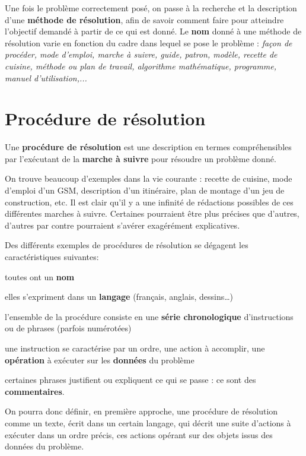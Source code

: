 		Une fois le problème correctement posé, on passe à la recherche et la
		description d’une \textbf{méthode de résolution}, afin de savoir
		comment faire pour atteindre l’objectif demandé à partir de ce qui est
		donné. Le \textbf{nom} donné à une méthode de résolution varie en
		fonction du cadre dans lequel se pose le problème : \textit{façon de
		procéder, mode d’emploi, marche à suivre, guide, patron, modèle,
		recette de cuisine, méthode ou plan de travail, algorithme
		mathématique, programme, manuel d’utilisation,...}

\section{Procédure de résolution}

	Une \textbf{procédure de résolution }est une description en termes
	compréhensibles par l'exécutant de la \textbf{marche à
	suivre} pour résoudre un problème donné.
	
	On trouve beaucoup d'exemples dans la vie courante :
	recette de cuisine, mode d’emploi d’un GSM, description d’un
	itinéraire, plan de montage d’un jeu de construction, etc. Il est clair
	qu’il y a une infinité de rédactions possibles de ces différentes
	marches à suivre. Certaines pourraient être plus précises que d’autres,
	d’autres par contre pourraient s’avérer exagérément explicatives.
	
	Des différents exemples de procédures de résolution se dégagent les
	caractéristiques suivantes:

	\begin{liste}
	\item toutes ont un \textbf{nom}
	\item elles s’expriment dans un \textbf{langage}
		(français, anglais, dessins…)
	\item l’ensemble de la procédure consiste 
		en une \textbf{série chronologique}
		d’instructions ou de phrases (parfois numérotées)
	\item une instruction se caractérise par un ordre, 
		une action à accomplir,
		une \textbf{opération} à exécuter sur les \textbf{données} du problème
	\item certaines phrases justifient ou expliquent ce qui se passe : 
		ce sont des \textbf{commentaires}.
	\end{liste}

	On pourra donc définir, en première approche, une procédure de
	résolution comme un texte, écrit dans un certain langage, qui décrit
	une suite d’actions à exécuter dans un ordre précis, ces actions
	opérant sur des objets issus des données du problème.

